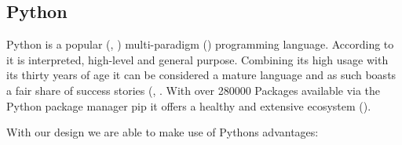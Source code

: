 \hypertarget{python}{%
\subsection{Python}\label{python}}

Python is a popular (\cite{instack}, \cite{octgit}) multi-paradigm (\cite[p. 6]{learningpython})
programming language. According to \cite{wikipython} it is interpreted,
high-level and general purpose. Combining its high usage with its thirty
years of age it can be considered a mature language and as such boasts a
fair share of success stories (\cite{pythonsuccess}, \cite[p. 9 - 10]{learningpython}. With
over 280000 Packages available via the Python package manager pip it
offers a healthy and extensive ecosystem (\cite{pythoncommunity}).

With our design we are able to make use of Pythons advantages:

